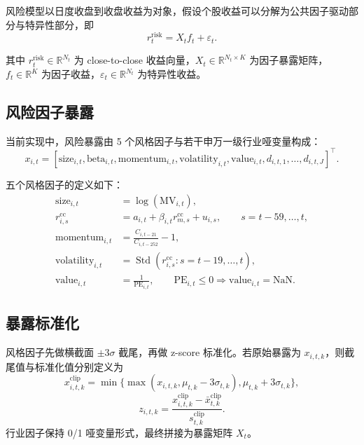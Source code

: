 \documentclass[12pt, a4paper, oneside]{article}
\newcommand{\Std}{\operatorname{Std}}
\begin{document}
风险模型以日度收盘到收盘收益为对象，假设个股收益可以分解为公共因子驱动部分与特异性部分，即
\begin{equation}
r_t^{\mathrm{risk}} = X_t f_t + \varepsilon_t.
\end{equation}

其中 \(r_t^{\mathrm{risk}} \in \mathbb R^{N_t}\) 为 close-to-close 收益向量，\(X_t \in \mathbb R^{N_t\times K}\) 为因子暴露矩阵，\(f_t \in \mathbb R^K\) 为因子收益，\(\varepsilon_t \in \mathbb R^{N_t}\) 为特异性收益。

\subsection{风险因子暴露}

当前实现中，风险暴露由 5 个风格因子与若干申万一级行业哑变量构成：
\begin{equation}
x_{i,t} = [\mathrm{size}_{i,t}, \mathrm{beta}_{i,t}, \mathrm{momentum}_{i,t}, \mathrm{volatility}_{i,t}, \mathrm{value}_{i,t}, d_{i,t,1}, \dots, d_{i,t,J}]^\top.
\end{equation}

五个风格因子的定义如下：
\begin{align}
\mathrm{size}_{i,t} &= \log(\mathrm{MV}_{i,t}), \\
r_{i,s}^{\mathrm{cc}} &= a_{i,t} + \beta_{i,t}r_{m,s}^{\mathrm{cc}} + u_{i,s}, \qquad s=t-59,\dots,t, \\
\mathrm{momentum}_{i,t} &= \frac{C_{i,t-21}}{C_{i,t-252}} - 1, \\
\mathrm{volatility}_{i,t} &= \Std(r_{i,s}^{\mathrm{cc}}: s=t-19,\dots,t), \\
\mathrm{value}_{i,t} &= \frac{1}{\mathrm{PE}_{i,t}}, \qquad \mathrm{PE}_{i,t}\le 0 \Rightarrow \mathrm{value}_{i,t}=\mathrm{NaN}.
\end{align}

\subsection{暴露标准化}

风格因子先做横截面 \(\pm 3\sigma\) 截尾，再做 z-score 标准化。若原始暴露为 \(x_{i,t,k}\)，则截尾值与标准化值分别定义为
\begin{equation}
x_{i,t,k}^{\mathrm{clip}} = \min\{\max(x_{i,t,k}, \mu_{t,k} - 3\sigma_{t,k}), \mu_{t,k} + 3\sigma_{t,k}\},
\end{equation}
\begin{equation}
z_{i,t,k} = \frac{x_{i,t,k}^{\mathrm{clip}} - \bar x_{t,k}^{\mathrm{clip}}}{s_{t,k}^{\mathrm{clip}}}.
\end{equation}
行业因子保持 0/1 哑变量形式，最终拼接为暴露矩阵 \(X_t\)。
\end{document}
